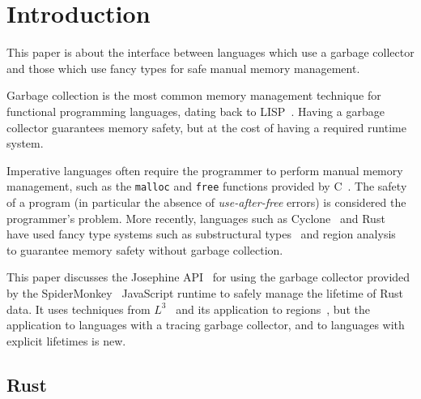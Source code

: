 \section{Introduction}

This paper is about the interface between languages
which use a garbage collector and those which use fancy
types for safe manual memory management.

Garbage collection is the most common memory management technique for
functional programming languages, dating back to LISP~\cite{LISP}.
Having a garbage collector guarantees memory safety, but at the
cost of having a required runtime system.

Imperative languages often require the programmer to perform
manual memory management, such as the \verb|malloc| and \verb|free|
functions provided by C~\cite{K+R}. The safety of a program
(in particular the absence of \emph{use-after-free} errors)
is considered the programmer's problem.
More recently, languages such as Cyclone~\cite{cyclone}
and Rust~\cite{rust} have used fancy type systems
such as substructural types~\cite{girard,Go4,walker}
and region analysis~\cite{regions} to guarantee memory
safety without garbage collection.

This paper discusses the Josephine API~\cite{josephine} for using the
garbage collector provided by the SpiderMonkey~\cite{spidermonkey}
JavaScript runtime to safely manage the lifetime of Rust~\cite{rust}
data. It uses techniques from $L^3$~\cite{l3} and its application
to regions~\cite{l3-with-regions}, but the application to languages
with a tracing garbage collector, and to languages with explicit
lifetimes is new.

\subsection{Rust}

